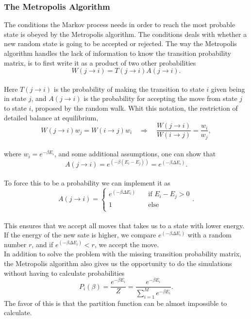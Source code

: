 \documentclass[12pt]{article}
\begin{document}
\begin{flushleft}
\subsubsection{The Metropolis Algorithm}
The conditions the Markov process needs in order to reach the most probable state is obeyed by the Metropolis algorithm. The conditions deals with whether a new random state is going to be accepted or rejected. The way the Metropolis algorithm handles the lack of information to know the transition probability matrix, is to first write it as a product of two other probabilities
\vspace{5mm}
$$W(j\rightarrow i) = T(j\rightarrow i)A(j\rightarrow i).$$\\
\vspace{5mm}
Here $T(j\rightarrow i)$ is the probability of making the transition to state $i$ given being in state $j$, and $A(j\rightarrow i)$ is the probability for accepting the move from state $j$ to state $i$, proposed by the random walk. Whit this notation, the restriction of detailed balance at equilibrium,
$$W(j\rightarrow i)w_j = W(i\rightarrow j)w_i \quad\Rightarrow\quad\frac{W(j\rightarrow i)}{W(i\rightarrow j)} = \frac{w_i}{w_j},$$\\
where $w_i = e^{-\beta E_i}$, and some additional assumptions, one can show that 
\vspace{5mm}
$$A(j\rightarrow i) = e^{(-\beta(E_i - E_j))} = e^{(-\beta\Delta E_i)}.$$\\
\vspace{5mm}
To force this to be a probability we can implement it as 
\vspace{5mm}
$$A(j\rightarrow i) = 
  \begin{cases}
    e^{(-\beta\Delta E_i)}       & \quad \text{if } E_i - E_j > 0\\
    1  & \quad \text{else}\\
  \end{cases}.$$\\
  \vspace{5mm}
This ensures that we accept all moves that takes us to a state with lower energy. If the energy of the new sate is higher, we compare $e^{(-\beta\Delta E_i)}$ with a random number $r$, and if $e^{(-\beta\Delta E_i)}<r$, we accept the move.\\
\vspace{5mm}
In addition to solve the problem with the missing transition probability matrix, the Metropolis algorithm also gives us the opportunity to do the simulations without having to calculate probabilities 
\vspace{5mm}
\begin{equation}\label{eq:prob_distr}
P_i(\beta) = \frac{e^{-\beta E_i}}{Z} =\frac{e^{-\beta E_i}}{\sum\limits_{i=1}^{M}e^{-\beta E_i}}.
\end{equation}
\vspace{5mm}
The favor of this is that the partition function can be almost impossible to calculate.


\end{flushleft}
\end{document}
